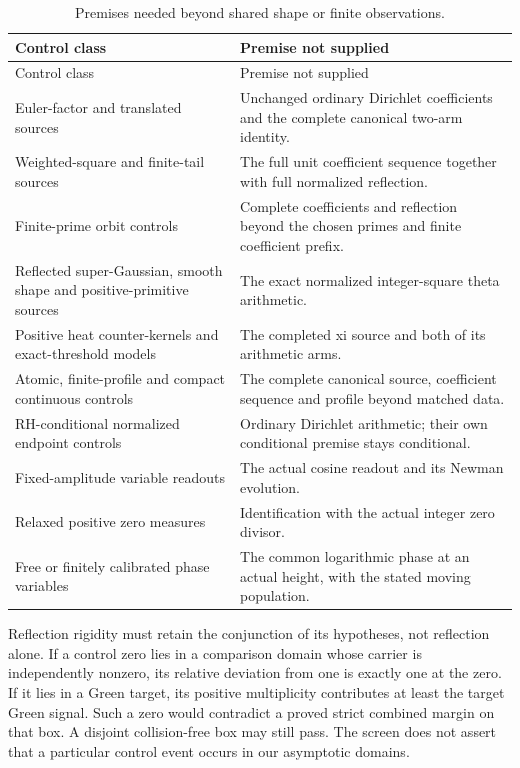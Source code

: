 \begin{longtable}{@{}>{\raggedright\arraybackslash}p{}>{\raggedright\arraybackslash}p{}@{}}
\caption{Premises needed beyond shared shape or finite observations.}
\label{tab:controls}\\
\toprule
Control class & Premise not supplied\\
\midrule
\endfirsthead
\toprule Control class & Premise not supplied\\\midrule
\endhead
Euler-factor and translated sources & Unchanged ordinary Dirichlet coefficients and the complete canonical two-arm identity.\\
Weighted-square and finite-tail sources & The full unit coefficient sequence together with full normalized reflection.\\
Finite-prime orbit controls & Complete coefficients and reflection beyond the chosen primes and finite coefficient prefix.\\
Reflected super-Gaussian, smooth shape and positive-primitive sources & The exact normalized integer-square theta arithmetic.\\
Positive heat counter-kernels and exact-threshold models & The completed xi source and both of its arithmetic arms.\\
Atomic, finite-profile and compact continuous controls & The complete canonical source, coefficient sequence and profile beyond matched data.\\
RH-conditional normalized endpoint controls & Ordinary Dirichlet arithmetic; their own conditional premise stays conditional.\\
Fixed-amplitude variable readouts & The actual cosine readout and its Newman evolution.\\
Relaxed positive zero measures & Identification with the actual integer zero divisor.\\
Free or finitely calibrated phase variables & The common logarithmic phase at an actual height, with the stated moving population.\\
\bottomrule
\end{longtable}

Reflection rigidity must retain the conjunction of its hypotheses,
not reflection alone. If a control zero lies in a comparison domain
whose carrier is independently nonzero, its relative deviation from
one is exactly one at the zero. If it lies in a Green target, its
positive multiplicity contributes at least the target Green signal.
Such a zero would contradict a proved strict combined margin on that
box. A disjoint collision-free box may still pass. The screen does not
assert that a particular control event occurs in our asymptotic domains.

